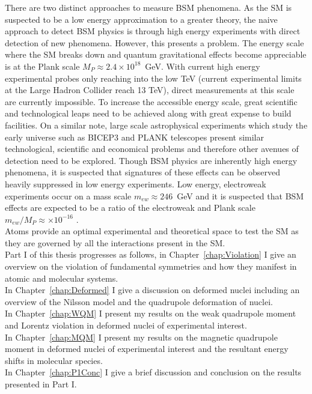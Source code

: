 \documentclass[10pt,a4paper, twoside]{report}
\begin{document}
There are two distinct approaches to measure BSM phenomena. As the SM is suspected to be a low energy approximation to a greater theory, the naive approach to detect BSM physics is through high energy experiments with direct detection of new phenomena. However, this presents a problem. The energy scale where the SM breaks down and quantum gravitational effects become appreciable is at the Plank scale $M_P \approx 2.4 \times 10^{18}$~GeV. With current high energy experimental probes only reaching into the low TeV (current experimental limits at the Large Hadron Collider reach 13 TeV), direct measurements at this scale are currently impossible. To increase the accessible energy scale, great scientific and technological leaps need to be achieved along with great expense to build facilities. On a similar note, large scale astrophysical experiments which study the early universe such as BICEP3\cite{BICEP3} and PLANK\cite{PLANK2016} telescopes present similar technological, scientific and economical problems and therefore other avenues of detection need to be explored. Though BSM physics are inherently high energy phenomena, it is suspected that signatures of these effects can be observed heavily suppressed in low energy experiments. Low energy,  electroweak experiments occur on a mass scale $m_{ew} \approx 246$~GeV and it is suspected that BSM effects are expected to be a ratio of the electroweak and Plank scale $m_{ew}/M_P \approx \times 10^{-16}$  \cite{Kostelecky1995}. \\
\linebreak
Atoms provide an optimal experimental and theoretical space to test the SM as they are governed by all the interactions present in the SM. \\
\linebreak
Part I of this thesis progresses as follows, in Chapter~\ref{chap:Violation} I give an overview on the violation of fundamental symmetries and how  they manifest in atomic and molecular systems. \\
\linebreak
In Chapter~\ref{chap:Deformed} I give a discussion on deformed nuclei including an overview of the Nilsson model and the quadrupole deformation of nuclei. \\
\linebreak
In Chapter~\ref{chap:WQM} I present my results on the weak quadrupole moment and Lorentz violation in deformed nuclei of experimental interest. \\
\linebreak
In Chapter~\ref{chap:MQM} I present my results on the magnetic quadrupole moment in deformed nuclei of experimental interest and the resultant energy shifts in molecular species. \\
\linebreak
In Chapter~\ref{chap:P1Conc} I give a brief discussion and conclusion on the results presented in Part I. \\
\linebreak
\end{document}
